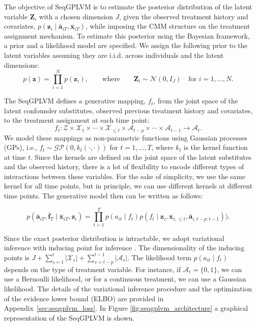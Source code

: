 
The objective of SeqGPLVM is to estimate the posterior distribution of 
the latent variable $\mathbf{Z}_i$ with a chosen dimension $J$, given the observed treatment history and covariates,
$p(\mathbf{z}_i \mid \bar{\mathbf{a}}_{iT}, \bar{\mathbf{x}}_{iT})$, while imposing the CMM structure on the treatment
assignment mechanism. To estimate this posterior 
using the 
Bayesian framework, a prior and 
a likelihood model are specified. We assign the following prior to the 
latent variables assuming they are i.i.d. across individuals and the latent dimensions:
\[
p(\mathbf{z}) = \prod_{i=1}^N p(\mathbf{z}_i),
\qquad \text{where} \qquad
\mathbf{Z}_i \sim \mathcal{N}(0,I_J)
\quad \text{for } i=1,\ldots,N.
\]

The SeqGPLVM defines a generative mapping, $f_t$, from the joint space of the latent 
confounder substitutes, 
observed previous treatment history and covariates, to the treatment assignment 
at each time point: 
\[
f_t : \mathcal{Z} \times \mathcal{X}_{1} \times \cdots \times \mathcal{X}_{\leq t} \times \mathcal{A}_{t-p} \times \cdots \times \mathcal{A}_{t-1} \to \mathcal{A}_t.
\]
We model these mappings as non-parametric functions using Gaussian processes (GPs), 
i.e., \(f_t \sim \mathcal{GP}(0, k_t(\cdot, \cdot))\) for \(t = 1, \ldots, T\), 
where \(k_t\) is the kernel function at time \(t\). 
Since the kernels are defined on the joint space of the latent substitutes 
and the observed history, 
there is a lot of flexibility to encode different types of interactions between 
these variables. For the sake 
of simplicity, we use the same kernel for all time points, but in principle, 
we can use different kernels at different time points. The generative model then 
can be written as follows: 

\[
p(\bar{\mathbf{a}}_{iT}, \bar{\mathbf{f}}_T  \mid \bar{\mathbf{x}}_{iT}, \mathbf{z}_i) = 
\prod_{t=1}^T p(a_{it} 
\mid f_t)p(f_t \mid \mathbf{z}_i, \bar{\mathbf{x}}_{i,\leq t}, \bar{\mathbf{a}}_{i,t-p:t-1})).
\]

Since the exact posterior distribution is intractable, we adopt variational inference with inducing point for inference \cite{titsiasBayesianGaussianProcess2010}. 
The dimensionality of the inducing points is \(J + \sum_{s=1}^{t} |\mathcal{X}_s| + \sum_{s=t-p}^{t-1}|\mathcal{A}_{s}|\). 
The likelihood term \(p(a_{it} \mid f_t)\) depends on the type of treatment variable. 
For instance, if \(\mathcal{A}_t = \{0,1\}\), we can use a Bernoulli likelihood, 
or for a continuous treatment, we can use a Gaussian likelihood. The details of the 
variational inference procedure and the optimization of the evidence lower bound (ELBO) are provided 
in Appendix~\ref{sec:seqgplvm_loss}. In Figure \ref{fig:seqgplvm_architecture} a 
graphical representation of the SeqGPLVM is shown.

